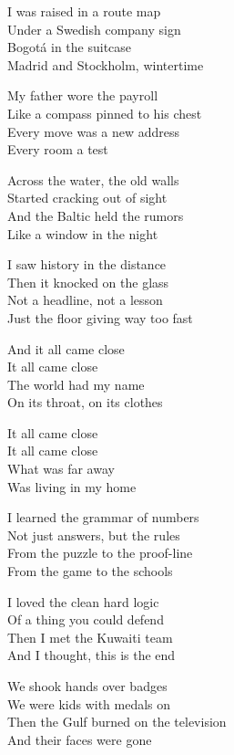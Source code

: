 \begin{lyrics}
I was raised in a route map\\
Under a Swedish company sign\\
Bogotá in the suitcase\\
Madrid and Stockholm, wintertime

My father wore the payroll\\
Like a compass pinned to his chest\\
Every move was a new address\\
Every room a test

Across the water, the old walls\\
Started cracking out of sight\\
And the Baltic held the rumors\\
Like a window in the night

I saw history in the distance\\
Then it knocked on the glass\\
Not a headline, not a lesson\\
Just the floor giving way too fast

And it all came close\\
It all came close\\
The world had my name\\
On its throat, on its clothes

It all came close\\
It all came close\\
What was far away\\
Was living in my home

I learned the grammar of numbers\\
Not just answers, but the rules\\
From the puzzle to the proof-line\\
From the game to the schools

I loved the clean hard logic\\
Of a thing you could defend\\
Then I met the Kuwaiti team\\
And I thought, this is the end

We shook hands over badges\\
We were kids with medals on\\
Then the Gulf burned on the television\\
And their faces were gone


\end{lyrics}
